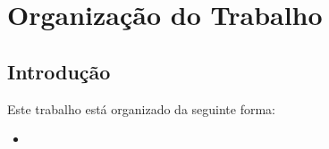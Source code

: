 \chapter{Organização do Trabalho}

\section{Introdução}
Este trabalho está organizado da seguinte forma:
\begin{itemize}
    \item
\end{itemize}
